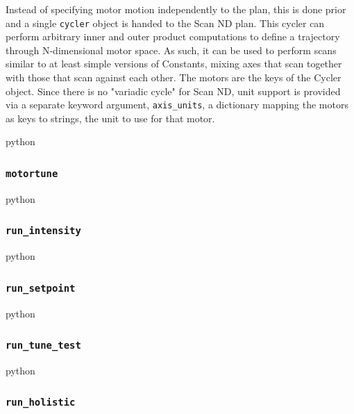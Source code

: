 Instead of specifying motor motion independently to the plan, this is done prior and a single \texttt{cycler}\cite{} object is handed to the Scan ND plan.
This cycler can perform arbitrary inner and outer product computations to define a trajectory through N-dimensional motor space.
As such, it can be used to perform scans similar to at least simple versions of Constants, mixing axes that scan together with those that scan against each other.
The motors are the keys of the Cycler object.
Since there is no "variadic cycle" for Scan ND, \wrightplans unit support is provided via a separate keyword argument, \texttt{axis\_units}, a dictionary mapping the motors as keys to strings, the unit to use for that motor.

\begin{codefragment}{python}
\end{codefragment}


\subsubsection{\texttt{motortune}}

\begin{codefragment}{python}
\end{codefragment}

\subsubsection{\texttt{run\_intensity}}

\begin{codefragment}{python}
\end{codefragment}

\subsubsection{\texttt{run\_setpoint}}

\begin{codefragment}{python}
\end{codefragment}

\subsubsection{\texttt{run\_tune\_test}}

\begin{codefragment}{python}
\end{codefragment}

\subsubsection{\texttt{run\_holistic}}



